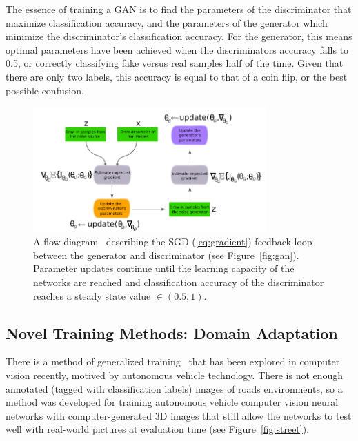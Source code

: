The essence of training a GAN is to find the parameters of the discriminator that maximize classification accuracy, and the parameters of the generator which minimize the discriminator's classification accuracy. For the generator, this means optimal parameters have been achieved when the discriminators accuracy falls to 0.5, or correctly classifying fake versus real samples half of the time. Given that there are only two labels, this accuracy is equal to that of a coin flip, or the best possible confusion.

\begin{figure}[ht!]
	\centering	\includegraphics[width=0.8\textwidth,keepaspectratio]{figs/coregan.png}
    \caption{A flow diagram~\cite{gan} describing the SGD (\ref{eq:gradient}) feedback loop between the generator and discriminator (see Figure~\ref{fig:gan}). Parameter updates continue until the learning capacity of the networks are reached and classification accuracy of the discriminator reaches a steady state value $\in (0.5, 1)$.}
\label{fig:coregan}      
\end{figure}

\subsection{Novel Training Methods: Domain Adaptation}
\label{domainadapt}
There is a method of generalized training~\cite{dadaptHRL} that has been explored in computer vision recently, motived by autonomous vehicle technology. There is not enough annotated (tagged with classification labels) images of roads environments, so a method was developed for training autonomous vehicle computer vision neural networks with computer-generated 3D images that still allow the networks to test well with real-world pictures at evaluation time (see Figure~\ref{fig:street}).

